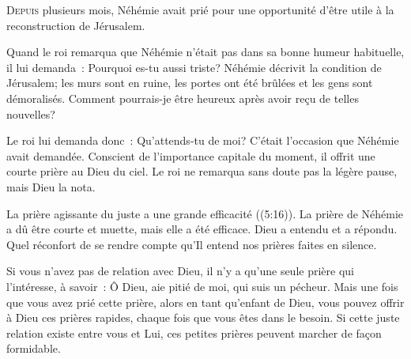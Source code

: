 \dvrule






\lettrine{D}{epuis} plusieurs mois, Néhémie avait prié
 pour une opportunité d'être utile à la reconstruction de Jérusalem.

Quand le roi remarqua que Néhémie n'était pas dans sa bonne humeur habituelle,
 il lui demanda~: \Og Pourquoi es-tu aussi triste? \Fg{}
 Néhémie décrivit la condition de Jérusalem; les murs sont en ruine,
 les portes ont été brûlées et les gens sont démoralisés.
 \Og Comment pourrais-je être heureux après avoir re\c{c}u de telles nouvelles? \Fg{}

Le roi lui demanda donc~: \Og Qu'attends-tu de moi? \Fg{}
 C'était l'occasion que Néhémie avait demandée.
 Conscient de l'importance capitale du moment,
 il offrit une courte prière au Dieu du ciel.
 Le roi ne remarqua sans doute pas la légère pause, mais Dieu la nota.


\Og La prière agissante du juste a une grande efficacité \Fg{}
 ((5:16)).
 La prière de Néhémie a dû être courte et muette, mais elle a été efficace.
 Dieu a entendu et a répondu.
 Quel réconfort de se rendre compte qu'Il entend nos prières faites en silence.

Si vous n'avez pas de relation avec Dieu, il n'y a qu'une seule prière
 qui l'intéresse, à savoir~:
 \Og Ô Dieu, aie pitié de moi, qui suis un pécheur. \Fg{}
 Mais une fois que vous avez prié cette prière, alors en tant qu'enfant de Dieu,
 vous pouvez offrir à Dieu ces prières rapides,
 chaque fois que vous êtes dans le besoin.
 Si cette juste relation existe entre vous et Lui,
 ces petites prières peuvent marcher de fa\c{c}on formidable. 

\dvrule




